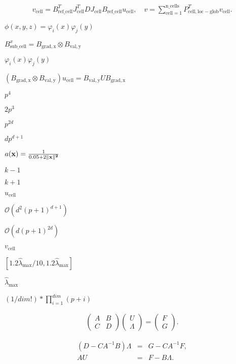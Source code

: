 \documentclass{article}
\begin{document}
\begin{eqnarray*} v_\mathrm{cell} = B_\mathrm{ref\_cell}^T J_\mathrm{cell}^T D J_\mathrm{cell} B_\mathrm{ref\_cell} u_\mathrm{cell}, \quad v = \sum_{\mathrm{cell}=1}^{\mathrm{n\_cells}} P_\mathrm{cell,{loc-glob}}^T v_\mathrm{cell}. \end{eqnarray*}
\pagebreak

$\phi(x,y,z) = \varphi_i(x) \varphi_j(y)$
\pagebreak

$B_\mathrm{sub\_cell}^x = B_\mathrm{grad,x} \otimes B_\mathrm{val,y}$
\pagebreak

$\varphi_i(x) \varphi_j(y)$
\pagebreak

$(B_\mathrm{grad,x} \otimes B_\mathrm{val,y})u_\mathrm{cell} = B_\mathrm{val,y} U B_\mathrm{grad,x}$
\pagebreak

$p^4$
\pagebreak

$2 p^3$
\pagebreak

$p^{2d}$
\pagebreak

$d p^{d+1}$
\pagebreak

$a(\mathbf x)=\frac{1}{0.05 + 2\|\bf x\|^2}$
\pagebreak

$k-1$
\pagebreak

$k+1$
\pagebreak

$u_\mathrm{cell}$
\pagebreak

$\mathcal O(d^2 (p+1)^{d+1})$
\pagebreak

$\mathcal O(d (p+1)^{2d})$
\pagebreak

$v_\mathrm{cell}$
\pagebreak

$[1.2 \hat{\lambda}_{\max}/10,1.2 \hat{\lambda}_{\max}]$
\pagebreak

$\hat{\lambda}_{\max}$
\pagebreak

$(1/dim!)*\prod_{i=1}^{dim}(p+i)$
\pagebreak

\begin{eqnarray*} \begin{pmatrix} A & B \\ C & D \end{pmatrix} \begin{pmatrix} U \\ \Lambda \end{pmatrix} = \begin{pmatrix} F \\ G \end{pmatrix}. \end{eqnarray*}
\pagebreak

\begin{eqnarray*} (D - C A^{-1} B) \Lambda &=& G - C A^{-1} F, \\ A U &=& F - B \Lambda. \end{eqnarray*}
\pagebreak
\end{document}
